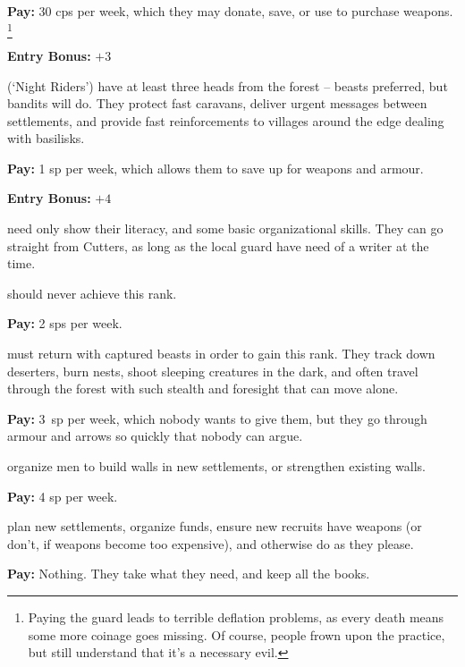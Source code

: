 \begin{multicols}{2}
\begin{description}
  \textbf{Pay:} 30 \glspl{cp} per week, which they may donate, save, or use to purchase weapons.%
  \footnote{Paying the \gls{guard} leads to terrible deflation problems, as every death means some more coinage goes missing.
  Of course, people frown upon the practice, but still understand that it's a necessary evil.}

  \textbf{Entry Bonus:} $+3$

  (`Night Riders')
  have at least three heads from the forest -- beasts preferred, but bandits will do.
  They protect fast caravans, deliver urgent messages between settlements, and provide fast reinforcements to \glspl{village} around the \gls{edge} dealing with basilisks.

  \textbf{Pay:} 1 \gls{sp} per week, which allows them to save up for weapons and armour.

  \textbf{Entry Bonus:} $+4$

  \item[\Glspl{jotter}]
  \label{jotter}%
  need only show their literacy, and some basic organizational skills.
  They can go straight from Cutters, as long as the local \gls{guard} have need of a writer at the time.

   should never achieve this rank.

  \textbf{Pay:} 2 \glspl{sp} per week.

  \label{ranger}
  must return with captured beasts in order to gain this rank.
  They track down deserters, burn nests, shoot sleeping creatures in the dark, and often travel through the forest with such stealth and foresight that can move alone.
  
  \textbf{Pay:} 3~\gls{sp} per week, which nobody wants to give them, but they go through armour and arrows so quickly that nobody can argue.

  organize men to build walls in new settlements, or strengthen existing walls.

  \textbf{Pay:} 4 \gls{sp} per week.

  plan new settlements, organize funds, ensure new recruits have weapons (or don't, if weapons become too expensive), and otherwise do as they please.

  \textbf{Pay:} Nothing.
  They take what they need, and keep all the books.

\end{description}


\end{multicols}
